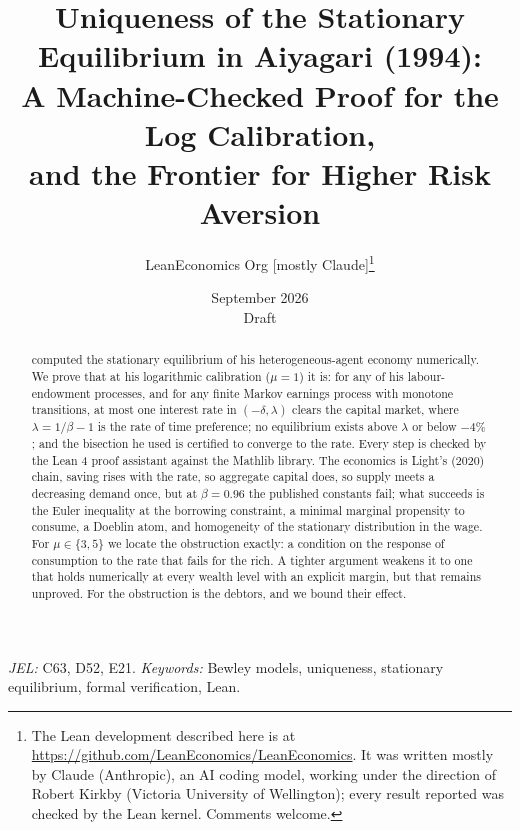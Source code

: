 \documentclass[11pt]{article}
\title{Uniqueness of the Stationary Equilibrium in Aiyagari (1994):\\
A Machine-Checked Proof for the Log Calibration,\\ and the Frontier for Higher Risk Aversion}
\author{LeanEconomics Org [mostly Claude]\thanks{The Lean development described here is at
\url{https://github.com/LeanEconomics/LeanEconomics}. It was written mostly by Claude (Anthropic),
an AI coding model, working under the direction of Robert Kirkby (Victoria University of
Wellington); every result reported was checked by the Lean kernel. Comments welcome.}}
\date{September 2026\\[0.5em]\small Draft}
\theoremstyle{definition}
\theoremstyle{remark}
\begin{document}
\maketitle

\begin{abstract}
\noindent
\citet{Aiyagari1994} computed the stationary equilibrium of his heterogeneous-agent economy
numerically. We prove that at his logarithmic calibration
($\mu=1$) it is: for any of his labour-endowment processes, and for any finite Markov earnings
process with monotone transitions, at most one interest rate in $(-\delta,\lambda)$ clears the
capital market, where $\lambda=1/\beta-1$ is the rate of time preference; no equilibrium exists
above $\lambda$ or below $-4\%$; and the bisection he used is certified to converge to the rate.
Every step is checked by the Lean 4 proof assistant against the Mathlib library. The economics is Light's (2020) chain, saving rises with the rate, so aggregate capital
does, so supply meets a decreasing demand once, but at $\beta=0.96$ the published constants fail; what
succeeds is the Euler inequality at the borrowing constraint, a
minimal marginal propensity to consume, a Doeblin atom, and homogeneity of the stationary
distribution in the wage. For $\mu\in\{3,5\}$ we locate the obstruction exactly: a condition on
the response of consumption to the rate that fails for the rich. A tighter argument weakens it to
one that holds numerically at every wealth level with an explicit margin, but that remains
unproved. For \citet{Huggett1993} the obstruction is the debtors, and we bound their effect.
\end{abstract}

\noindent\emph{JEL:} C63, D52, E21. \quad \emph{Keywords:} Bewley models, uniqueness, stationary
equilibrium, formal verification, Lean.













\appendix


\end{document}
